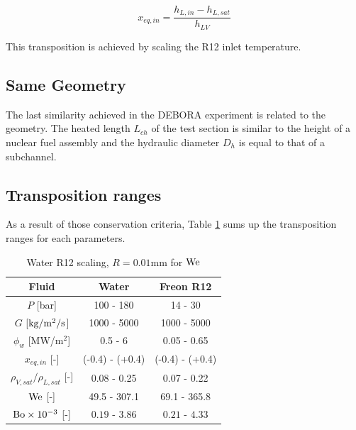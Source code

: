 \begin{equation}
x_{eq,in} = \frac{h_{L,in} - h_{L,sat}}{h_{LV}}
\end{equation}

\begin{note*}{}
This transposition is achieved by scaling the R12 inlet temperature.
\end{note*}

\subsection{Same Geometry}

The last similarity achieved in the DEBORA experiment is related to the geometry. The heated length $L_{ch}$ of the test section is similar to the height of a nuclear fuel assembly and the hydraulic diameter $D_{h}$ is equal to that of a subchannel.


\subsection{Transposition ranges}

As a result of those conservation criteria, Table \ref{tab:R12_PWR_transposition} sums up the transposition ranges for each parameters.



\begin{table}[!h]
\centering
\begin{tabular}{c||c|c} 

Fluid & Water & Freon R12 \\
\hline \hline
$P$ [bar] & 100 - 180 & 14 - 30\\
%
$G$ [$\text{kg/m$^{2}$/s}$] & 1000 - 5000 & 1000 - 5000\\
%
$\phi_{w}$ [MW/m$^{2}$] & 0.5 - 6 & 0.05 - 0.65\\ 
%
$x_{eq,in}$ [-] & (-0.4) - (+0.4) & (-0.4) - (+0.4)\\
\hline
\hline 
${\rho_{V,sat}}/{\rho_{L,sat}}$ [-] & 0.08 - 0.25 & 0.07 - 0.22\\
%
$\mathrm{We}$ [-] & 49.5 - 307.1 & 69.1 - 365.8\\
%
$\mathrm{Bo} \times 10^{-3} $ [-] &  $0.19$ - $3.86$ & $0.21$ - $4.33$ \\
\hline
\end{tabular}

\caption{Water R12 scaling, $R=0.01$mm for $\mathrm{We}$}
\label{tab:R12_PWR_transposition}

\end{table}



